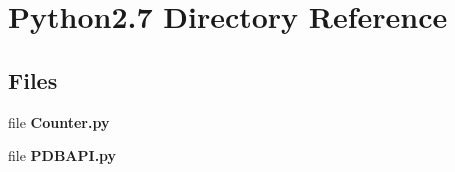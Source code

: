 \section{Python2.7 Directory Reference}
\label{dir_42e9b67ffba52c13982b85f2f69ab462}
\subsection*{Files}
\begin{DoxyCompactItemize}
\item 
file {\bf Counter.\+py}
\item 
file {\bf P\+D\+B\+A\+P\+I.\+py}
\end{DoxyCompactItemize}
